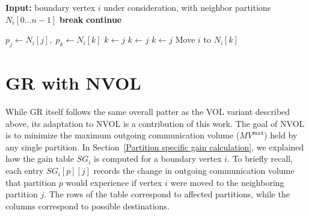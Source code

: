 \begin{algorithm}[H]
	\caption{GR with VOL}\label{alg:ref_vol}
	\begin{algorithmic}
		\State \textbf{Input:} boundary vertex $i$ under consideration, with neighbor partitions $N_i[0 \ldots n{-}1]$
		\State {}
		  
		\State \textbf{break}
		\EndIf
		\EndFor
		 \textbf{continue}  \EndIf
		
		  
		\State $p_j \gets N_i[j],\; p_k \gets N_i[k]$
		\State $k \gets j$ 
		\State $k \gets j$ 
		\State $k \gets j$ 
		\EndIf
		\EndFor
		\State Move $i$ to $N_i[k]$
		\EndIf
	\end{algorithmic}
\end{algorithm}

\section{GR with NVOL}\label{sec:NVOL refinement}
While GR itself follows the same overall patter as the VOL variant described above, its adaptation to NVOL is a contribution of this work. The goal of NVOL is to minimize the maximum outgoing communication volume ($MV^{\mathrm{max}}$) held by any single partition. In Section~\ref{Partition specific gain calculation}, we explained how the gain table $SG_i$ is computed for a boundary vertex $i$. To briefly recall, each entry $SG_i[p][j]$ records the change in outgoing communication volume that partition $p$ would experience if vertex $i$ were moved to the neighboring partition $j$. The rows of the table correspond to affected partitions, while the columns correspond to possible destinations. 

